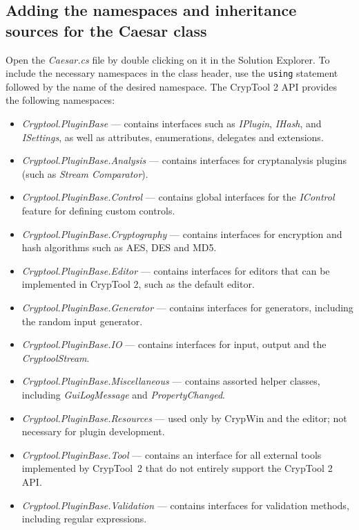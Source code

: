 \subsection{Adding the namespaces and inheritance sources for the Caesar class}
\label{sec:AddingTheNamespacesAndInheritanceSourcesForTheCaesarClass}

Open the \textit{Caesar.cs} file by double clicking on it in the Solution Explorer. To include the necessary namespaces in the class header, use the \texttt{using} statement followed by the name of the desired namespace. The CrypTool 2 API provides the following namespaces:

\begin{itemize}
	\item \textit{Cryptool.PluginBase} --- contains interfaces such as \textit{IPlugin}, \textit{IHash}, and \textit{ISettings}, as well as attributes, enumerations, delegates and extensions.
	\item \textit{Cryptool.PluginBase.Analysis} --- contains interfaces for cryptanalysis plugins (such as \textit{Stream Comparator}).
	\item \textit{Cryptool.PluginBase.Control} --- contains global interfaces for the \textit{IControl} feature for defining custom controls.
	\item \textit{Cryptool.PluginBase.Cryptography} --- contains interfaces for encryption and hash algorithms such as AES, DES and MD5.
	\item \textit{Cryptool.PluginBase.Editor} --- contains interfaces for editors that can be implemented in CrypTool 2, such as the default editor.
	\item \textit{Cryptool.PluginBase.Generator} --- contains interfaces for generators, including the random input generator.
	\item \textit{Cryptool.PluginBase.IO} --- contains interfaces for input, output and the \textit{CryptoolStream}.
	\item \textit{Cryptool.PluginBase.Miscellaneous} --- contains assorted helper classes, including \textit{GuiLogMessage} and \textit{PropertyChanged}.
	\item \textit{Cryptool.PluginBase.Resources} --- used only by CrypWin and the editor; not necessary for plugin development.
	\item \textit{Cryptool.PluginBase.Tool} --- contains an interface for all external tools implemented by CrypTool~2 that do not entirely support the CrypTool 2 API.
	\item \textit{Cryptool.PluginBase.Validation} --- contains interfaces for validation methods, including regular expressions.
\end{itemize}

